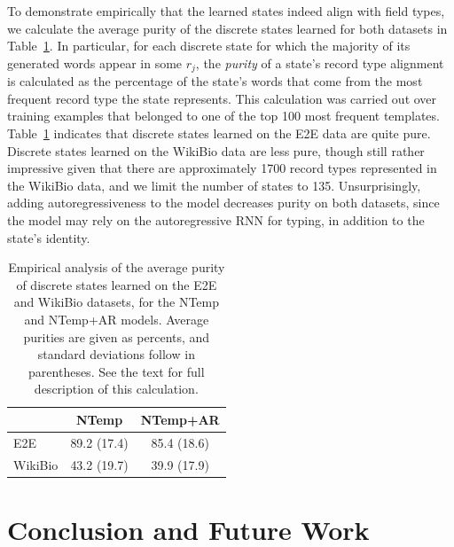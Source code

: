 \documentclass[11pt,a4paper]{article}
\begin{document}
To demonstrate empirically that the learned states indeed align with field types, we calculate the average purity of the discrete states learned for both datasets in Table~\ref{tab:alignment}. In particular, for each discrete state for which the majority of its generated words appear in some $r_j$, the \textit{purity} of a state's record type alignment is calculated as the percentage of the state's words that come from the most frequent record type the state represents. This calculation was carried out over training examples that belonged to one of the top 100 most frequent templates. Table~\ref{tab:alignment} indicates that discrete states learned on the E2E data are quite pure. Discrete states learned on the WikiBio data are less pure, though still rather impressive given that there are approximately 1700 record types represented in the WikiBio data, and we limit the number of states to 135. Unsurprisingly, adding autoregressiveness to the model decreases purity on both datasets, since the model may rely on the autoregressive RNN for typing, in addition to the state's identity.



\begin{table}[t!]
\small
\centering
\begin{tabular}{@{}lcc}
\toprule
 & NTemp & NTemp+AR\\
\midrule
E2E & 89.2 (17.4) & 85.4 (18.6)  \\
WikiBio & 43.2 (19.7) & 39.9 (17.9) \\
\bottomrule
\end{tabular}
\caption{Empirical analysis of the average purity of discrete states learned on the E2E and WikiBio datasets, for the NTemp and NTemp+AR models. Average purities are given as percents, and standard deviations follow in parentheses. See the text for full description of this calculation.}
\label{tab:alignment}
\end{table}



\section{Conclusion and Future Work}
\end{document}
